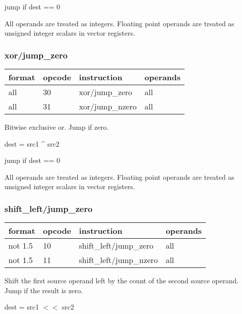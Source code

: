 \documentclass[forwardcom.tex]{subfiles}
\begin{document}
jump if dest == 0
\vspace{2mm}

All operands are treated as integers. 
Floating point operands are treated as unsigned integer scalars in vector registers.
\vspace{2mm}

\subsubsection{xor/jump\_zero}
\label{table:xorJumpZeroInstruction}
\begin{tabular}{|p{16mm}|p{12mm}|p{60mm}|p{50mm}|}
\hline
\bfseries format & \bfseries opcode & \bfseries instruction & \bfseries operands \\ \hline
all & 30 & xor/jump\_zero & all \\ \hline
all & 31 & xor/jump\_nzero & all \\ \hline
\end{tabular}
\vspace{2mm}

Bitwise exclusive or. Jump if zero.
\vspace{2mm}

dest = src1 \^{ } src2

jump if dest == 0
\vspace{2mm}

All operands are treated as integers. 
Floating point operands are treated as unsigned integer scalars in vector registers.


\subsubsection{shift\_left/jump\_zero}
\label{table:shiftLeftJumpZeroInstruction}
\begin{tabular}{|p{16mm}|p{12mm}|p{60mm}|p{50mm}|}
\hline
\bfseries format & \bfseries opcode & \bfseries instruction & \bfseries operands \\ \hline
not 1.5 & 10 & shift\_left/jump\_zero & all \\ \hline
not 1.5 & 11 & shift\_left/jump\_nzero & all \\ \hline
\end{tabular}
\vspace{2mm}

Shift the first source operand left by the count of the second source operand. Jump if the result is zero.
\vspace{2mm}

dest = src1 $<<$ src2
\end{document}
